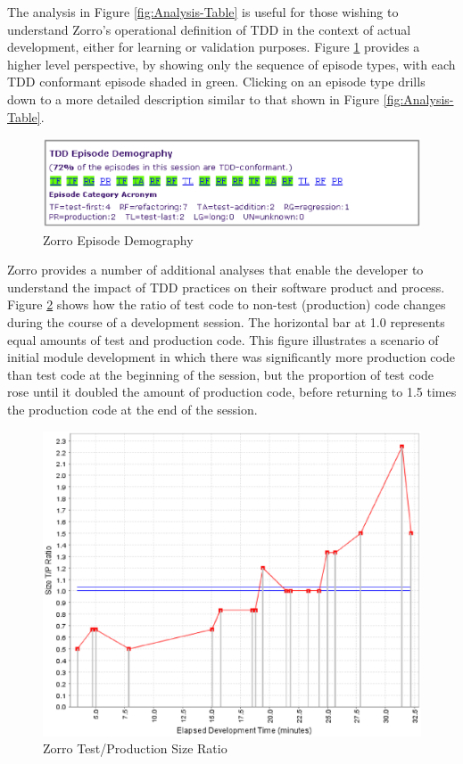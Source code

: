 \documentclass[smallextended]{svjour3}     %
\begin{document}
The analysis in Figure \ref{fig:Analysis-Table} is useful for those wishing
to understand Zorro's operational definition of TDD in the context of
actual development, either for learning or validation purposes.  Figure
\ref{fig:Analysis-Demography} provides a higher level perspective, by
showing only the sequence of episode types, with each TDD conformant
episode shaded in green. Clicking on an episode type drills down to a more
detailed description similar to that shown in Figure
\ref{fig:Analysis-Table}.

\begin{figure}[th]
  \center
  \includegraphics[width=1.0\textwidth]{zorro-episode-demography.eps}
  \caption{Zorro Episode Demography}
  \label{fig:Analysis-Demography}
\end{figure} 

Zorro provides a number of additional analyses that enable the developer to
understand the impact of TDD practices on their software product and
process.  Figure \ref{fig:Analysis-Ratio} shows how the ratio of test code
to non-test (production) code changes during the course of a development
session.  The horizontal bar at 1.0 represents equal amounts of test and
production code.  This figure illustrates a scenario of initial module
development in which there was significantly more production code than test
code at the beginning of the session, but the proportion of test code rose
until it doubled the amount of production code, before returning to 1.5
times the production code at the end of the session.

\begin{figure}[th]
  \center
  \includegraphics[width=1.0\textwidth]{zorro-test-production-size-ratio.eps}
  \caption{Zorro Test/Production Size Ratio}
  \label{fig:Analysis-Ratio}
\end{figure} 
\end{document}
